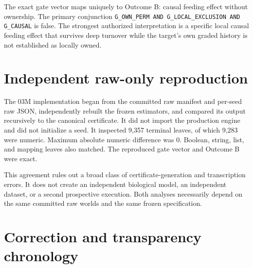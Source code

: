 \documentclass[10pt]{article}
\newcommand{\code}[1]{\texttt{#1}}
\begin{document}
The exact gate vector maps uniquely to Outcome B: causal feeding effect without ownership. The primary conjunction \code{G\_OWN\_PERM AND G\_LOCAL\_EXCLUSION AND G\_CAUSAL} is false. The strongest authorized interpretation is a specific local causal feeding effect that survives deep turnover while the target's own graded history is not established as locally owned.

\section{Independent raw-only reproduction}

The 03M implementation began from the committed raw manifest and per-seed raw JSON, independently rebuilt the frozen estimators, and compared its output recursively to the canonical certificate. It did not import the production engine and did not initialize a seed. It inspected 9,357 terminal leaves, of which 9,283 were numeric. Maximum absolute numeric difference was 0. Boolean, string, list, and mapping leaves also matched. The reproduced gate vector and Outcome B were exact.

This agreement rules out a broad class of certificate-generation and transcription errors. It does not create an independent biological model, an independent dataset, or a second prospective execution. Both analyses necessarily depend on the same committed raw worlds and the same frozen specification.

\section{Correction and transparency chronology}
\end{document}
